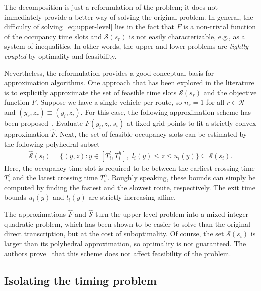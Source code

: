 \documentclass{report}
\theoremstyle{definition}
\theoremstyle{plain}
\begin{document}
The decomposition is just a reformulation of the problem; it does not
immediately provide a better way of solving the original problem.
%
In general, the difficulty of solving~\eqref{eq:upper-level} lies in the fact that $F$ is a
non-trivial function of the occupancy time slots and $\mathcal{S}(s_{r})$ is not
easily characterizable, e.g., as a system of inequalities. In other words, the
upper and lower problems are \emph{tightly coupled} by optimality and feasibility.

Nevertheless, the reformulation provides a good conceptual basis for
approximation algorithms.
%
One approach that has been explored in the literature is to explicitly
approximate the set of feasible time slots $\mathcal{S}(s_r)$ and the objective
function $F$.
%
Suppose we have a single vehicle per route, so $n_r = 1$ for all
$r \in \mathcal{R}$ and $(y_{r}, z_{r}) \equiv (y_{i},z_{i})$.
%
For this case, the following approximation scheme has been proposed~\cite{hultApproximateSolutionOptimal2015}. 
%
Evaluate $F(y_{i}, z_{i}, s_{i})$ at fixed grid points to fit a strictly convex approximation $\hat{F}$.
%
Next, the set of feasible occupancy slots can be estimated by the following
polyhedral subset
\begin{align}
  \hat{\mathcal{S}}(s_i) = \{ (y, z) : y \in [T_{i}^{l},T_{i}^{h}], \; l_{i}(y) \leq z \leq u_{i}(y) \} \subseteq \mathcal{S}(s_{i}) .
\end{align}
Here, the occupancy time slot is required to be between the earliest crossing time
$T_{i}^{l}$ and the latest crossing time $T_{i}^{h}$. Roughly speaking, these
bounds can simply be computed by finding the fastest and the slowest route,
respectively.
%
The exit time bounds $u_{i}(y)$ and $l_{i}(y)$ are strictly increasing affine.

The approximations $\hat{F}$ and $\hat{\mathcal{S}}$ turn the upper-level problem into a
mixed-integer quadratic problem, which has been shown to be easier to solve than
the original direct transcription, but at the cost of suboptimality. Of course,
the set $\mathcal{S}(s_i)$ is larger than its polyhedral approximation, so
optimality is not guaranteed.
%
The authors prove~\cite{hultTechnicalReportApproximate} that this
scheme does not affect feasibility of the problem.


\subsection{Isolating the timing problem}\label{sec:delay-minimization}
\end{document}
